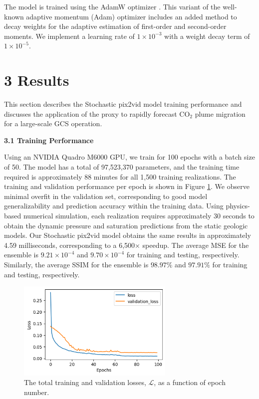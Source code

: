\documentclass[10pt, twoside]{article}
\begin{document}
The model is trained using the AdamW optimizer \cite{loshchilov2017decoupled}. This variant of the well-known adaptive momentum (Adam) optimizer \cite{kingma2014adam} includes an added method to decay weights for the adaptive estimation of first-order and second-order moments. We implement a learning rate of $1\times10^{-3}$ with a weight decay term of $1\times10^{-5}$. 


\section*{\textbf{3 Results}}

This section describes the Stochastic pix2vid model training performance and discusses the application of the proxy to rapidly forecast CO$_2$ plume migration for a large-scale GCS operation.

\textbf{3.1 Training Performance}

Using an NVIDIA Quadro M6000 GPU, we train for 100 epochs with a batch size of 50. The model has a total of 97,523,370 parameters, and the training time required is approximately 88 minutes for all 1,500 training realizations. The training and validation performance per epoch is shown in Figure \ref{train_perf}. We observe minimal overfit in the validation set, corresponding to good model generalizability and prediction accuracy within the training data. Using physics-based numerical simulation, each realization requires approximately 30 seconds to obtain the dynamic pressure and saturation predictions from the static geologic models. Our Stochastic pix2vid model obtains the same results in approximately 4.59 milliseconds, corresponding to a 6,500× speedup. The average MSE for the ensemble is $9.21\times10^{-4}$ and $9.70\times10^{-4}$ for training and testing, respectively. Similarly, the average SSIM for the ensemble is $98.97\%$ and $97.91\%$ for training and testing, respectively.

\begin{figure}[h]
    \centering
    \includegraphics[width=7.5cm]{figures/train_performance.png}
    \caption{The total training and validation losses, $\mathcal{L}$, as a function of epoch number.}
    \label{train_perf}
\end{figure}
\end{document}

